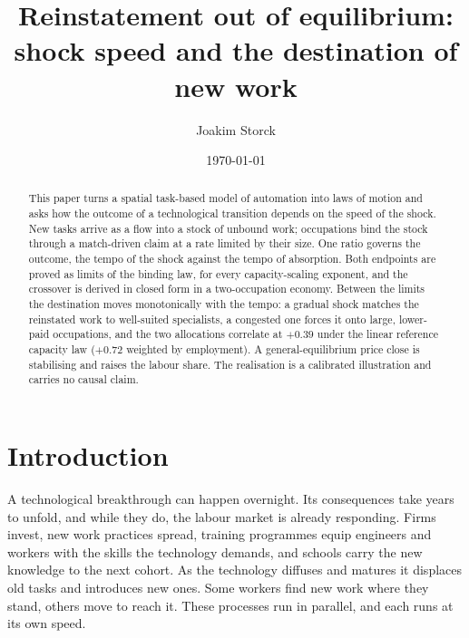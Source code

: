 \documentclass[12pt, a4paper]{article}
\title{Reinstatement out of equilibrium: shock speed and the destination of new work}
\author{Joakim Storck}
\date{\today}
\begin{document}
\maketitle

\begin{abstract}
\noindent
This paper turns a spatial task-based model of automation into laws of
motion and asks how the outcome of a technological transition depends
on the speed of the shock. New tasks arrive as a flow into a stock of
unbound work; occupations bind the stock through a match-driven claim
at a rate limited by their size. One ratio governs the outcome, the
tempo of the shock against the tempo of absorption. Both endpoints are
proved as limits of the binding law, for every capacity-scaling
exponent, and the crossover is derived in closed form in a
two-occupation economy. Between the limits the destination moves
monotonically with the tempo: a gradual shock matches the reinstated
work to well-suited specialists, a congested one forces it onto large,
lower-paid occupations, and the two allocations correlate at $+0.39$
under the linear reference capacity law ($+0.72$ weighted by
employment). A general-equilibrium price close is stabilising and
raises the labour share. The realisation is a calibrated illustration
and carries no causal claim.
\end{abstract}

\newpage

\section{Introduction}
\label{sec:intro}

A technological breakthrough can happen overnight. Its consequences
take years to unfold, and while they do, the labour market is already
responding. Firms invest, new work practices spread, training
programmes equip engineers and workers with the skills the technology
demands, and schools carry the new knowledge to the next cohort. As the
technology diffuses and matures it displaces old tasks and introduces
new ones. Some workers find new work where they stand, others move to
reach it. These processes run in parallel, and each runs at its own
speed.
\end{document}
